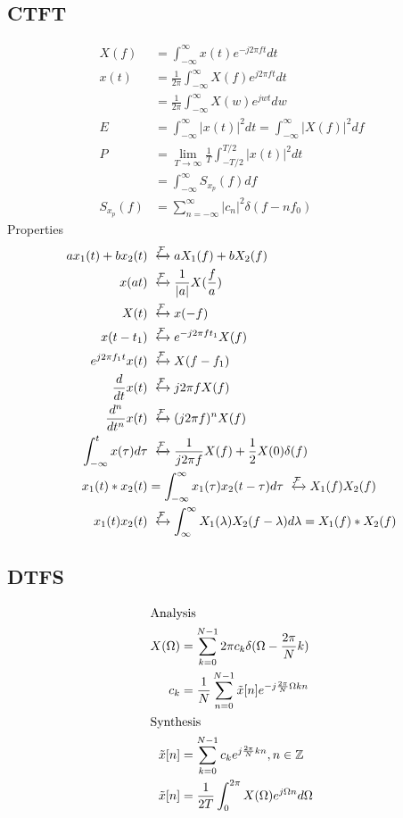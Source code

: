 \subsection{CTFT}
\begin{align*}
    X(f) &= \int_{-\infty}^\infty x(t)e^{-j2\pi ft}dt\\
    x(t) &= \frac{1}{2\pi}\int_{-\infty}^\infty X(f) e^{j2\pi ft}dt\\
    &= \frac{1}{2\pi}\int_{-\infty}^\infty X(w) e^{jwt}dw\\
    E &= \int_{-\infty}^\infty |x(t)|^2dt = \int_{-\infty}^\infty |X(f)|^2df\\
    P &= \lim_{T\rightarrow \infty}\frac{1}{T}\int_{-T/2}^{T/2}|x(t)|^2 dt\\
    &= \int_{-\infty}^\infty S_{x_p}(f)df\\
    S_{x_p}(f) &= \sum_{n=-\infty}^\infty |c_n|^2\delta(f-nf_0)
\end{align*}
Properties
\begin{align*}
    a x_1(t) + b x_2(t) & \xleftrightarrow{\mathcal{F}} a X_1(f) + b X_2(f)\\
    x(a t) &\xleftrightarrow{\mathcal{F}} \frac{1}{|a|} X(\frac{f}{a})\\
    X(t) &\xleftrightarrow{\mathcal{F}} x(-f)\\
    x(t-t_1) &\xleftrightarrow{\mathcal{F}} e^{-j2\pi ft_1}X(f)\\
    e^{j2\pi f_1 t}x(t) &\xleftrightarrow{\mathcal{F}} X(f-f_1)\\
    \frac{d}{dt}x(t) &\xleftrightarrow{\mathcal{F}} j2\pi fX(f)\\
    \frac{d^n}{dt^n}x(t) &\xleftrightarrow{\mathcal{F}} (j2\pi f)^n X(f)\\
    \int_{-\infty}^t x(\tau)d\tau &\xleftrightarrow{\mathcal{F}} \frac{1}{j2\pi f}X(f) + \frac{1}{2}X(0)\delta(f)\\
    x_1(t) * x_2(t) &= \int_{-\infty}^\infty x_1(\tau)x_2(t-\tau)d\tau \xleftrightarrow{\mathcal{F}} X_1(f)X_2(f)\\
    x_1(t) x_2(t) &\xleftrightarrow{\mathcal{F}} \int_{\infty}^\infty X_1(\lambda)X_2(f-\lambda)d\lambda = X_1(f)*X_2(f)
\end{align*}
\subsection{DTFS}
\begin{align*}
    \intertext{Analysis}
    X(\Omega) &= \sum_{k=0}^{N-1}2\pi c_k \delta(\Omega-\frac{2\pi}{N}k)\\
    c_k &= \frac{1}{N}\sum_{n=0}^{N-1}\Tilde{x}[n]e^{-j\frac{2\pi}{N}\Omega kn}\\
    \intertext{Synthesis}
    \Tilde{x}[n] &= \sum_{k=0}^{N-1} c_k e^{j\frac{2\pi}{N}kn}, n\in \mathbb{Z}\\
    \Tilde{x}[n] &= \frac{1}{2T}\int_0^{2\pi}X(\Omega)e^{j\Omega n}d\Omega
\end{align*}
